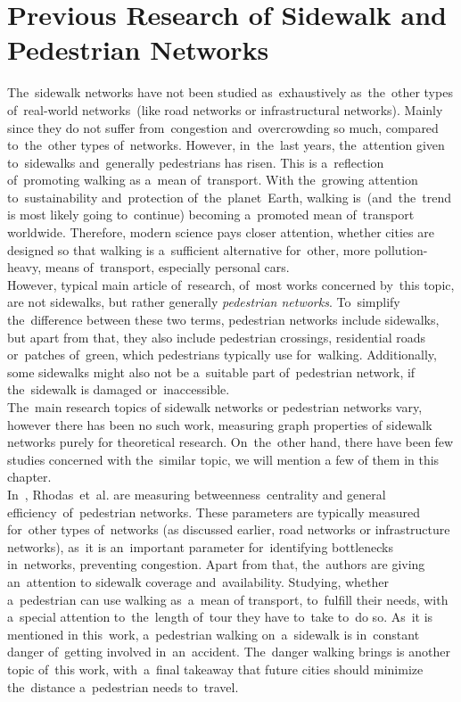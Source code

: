 \chapter{Previous Research of Sidewalk and Pedestrian Networks}
The~sidewalk networks have not been studied as~exhaustively as~the~other types of~real-world networks~(like road networks or infrastructural networks). Mainly since they do not suffer from~congestion and~overcrowding so much, compared to~the~other types of~networks. However, in~the~last years, the~attention given to~sidewalks and~generally pedestrians has risen. This is a~reflection of~promoting walking as a~mean of~transport. With the~growing attention to~sustainability and~protection of~the~planet~Earth, walking is~(and~the~trend is most likely going to~continue) becoming a~promoted mean of~transport worldwide. Therefore, modern science pays closer attention, whether cities are designed so that walking is a~sufficient alternative for~other, more pollution-heavy, means of~transport, especially personal cars. \\
However, typical main article of~research, of~most works concerned by~this topic, are not sidewalks, but rather generally \textit{pedestrian networks}. To~simplify the~difference between these two terms, pedestrian networks include sidewalks, but apart from that, they also include pedestrian crossings, residential roads or~patches of~green, which pedestrians typically use for~walking. Additionally, some sidewalks might also not be a~suitable part of~pedestrian network, if the~sidewalk is damaged or~inaccessible. \\
The~main research topics of sidewalk networks or pedestrian networks vary, however there has been no such work, measuring graph properties of sidewalk networks purely for theoretical research. On~the~other hand, there have been few studies concerned with the~similar topic, we will mention a few of them in this chapter.\\
In~\cite{Rhodas}, Rhodas~et~al. are measuring betweenness~centrality and general efficiency~of~pedestrian networks. These parameters are typically measured for~other types of~networks (as discussed earlier, road networks or infrastructure networks), as~it is an~important parameter for~identifying bottlenecks in~networks, preventing congestion. Apart from that, the~authors are giving an~attention to sidewalk coverage and~availability. Studying, whether a~pedestrian can use walking as~a~mean of transport, to~fulfill their needs, with a~special attention to~the~length of~tour they have to~take to~do so. As~it is mentioned in this~work, a~pedestrian walking on~a~sidewalk is in~constant danger of~getting involved in~an~accident. The~danger walking brings is another topic of~this work, with~a~final takeaway that future cities should minimize the~distance a~pedestrian needs to~travel. \\
